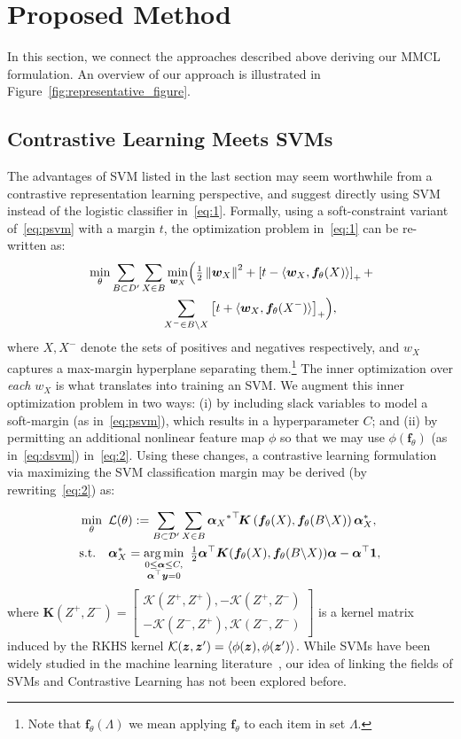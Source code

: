 \documentclass[letterpaper]{article} \usepackage{aaai22}  \usepackage{times}  \usepackage{helvet}  \usepackage{courier}  \usepackage[hyphens]{url}  \usepackage{graphicx} \urlstyle{rm} \def\UrlFont{\rm}  \usepackage{natbib}  \usepackage{caption} \DeclareCaptionStyle{ruled}{labelfont=normalfont,labelsep=colon,strut=off} \frenchspacing  \setlength{\pdfpagewidth}{8.5in}  \setlength{\pdfpageheight}{11in}
\newcommand{\vy}{\bm{y}}
\newcommand{\vw}{\bm{w}}
\newcommand{\valpha}{\bm{\alpha}}
\newcommand{\vone}{\bm{1}}
\newcommand{\dataset}{\mathcal{D}}
\newcommand{\pZ}{{Z}^{+}}
\newcommand{\nZ}{{Z}^{-}}
\newcommand{\batch}{B}
\newcommand{\kernel}{\mathcal{K}}
\newcommand{\Kernel}{\bm{K}}
\newcommand{\sX}{{X}}
\newcommand{\ft}{\bm{f}_\theta}
\newcommand{\hinge}[1]{\left[#1\right]_+}
\newcommand{\enorm}[1]{\left\|#1\right\|}
\newcommand{\ip}[2]{\langle #1, #2 \rangle}
\DeclareMathOperator*{\argmin}{arg\,min}
\begin{document}
\section{Proposed Method}
In this section, we connect the approaches described above deriving our MMCL formulation. An overview of our approach is illustrated in Figure~\ref{fig:representative_figure}.

\subsection{Contrastive Learning Meets SVMs}
The advantages of SVM listed in the last section may seem worthwhile from a contrastive representation learning perspective, and suggest directly using SVM instead of the logistic classifier in~\eqref{eq:1}. Formally, using a soft-constraint variant of~\eqref{eq:psvm} with a margin $t$, the optimization problem in~\eqref{eq:1} can be re-written as:
\begin{align}
  \label{eq:2}
  &\min\limits_\theta\sum\limits_{B \subset D'}\sum\limits_{X \in B} \min\limits_{\vw_X}\Bigl(\tfrac12\enorm{\vw_X}^2 +
  \hinge{t - \ip{\vw_X}{\ft(X)}} + \notag\\
  &\qquad\qquad\qquad\sum\limits_{X^- \in B\backslash X} \hinge{t + \ip{\vw_X}{\ft(X^-)}}\Bigr),
\end{align}
where $X, X^-$ denote the sets of positives and negatives respectively, and $w_X$ captures a max-margin hyperplane separating them.\footnote{Note that $\ft(\Lambda)$ we mean applying $\ft$ to each item in set $\Lambda$.} The inner optimization over \emph{each} $w_X$ is what translates into training an SVM. We augment this inner optimization problem in two ways: (i) by including slack variables to model a soft-margin (as in~\eqref{eq:psvm}), which results in a hyperparameter $C$; and (ii) by permitting an additional nonlinear feature map $\phi$ so that we may use $\phi(\ft)$ (as in~\eqref{eq:dsvm}) in~\eqref{eq:2}. Using these changes, a contrastive learning formulation via maximizing the SVM classification margin may be derived (by rewriting~\eqref{eq:2}) as:

\begin{align}
    &\min_{\theta}\ {\cal L}(\theta) := \sum_{\batch\subset\dataset'}\sum_{\sX\in\batch}  \valpha_X{^*}^{\top}\!\Kernel\left(\ft(\sX), \ft(\batch\backslash\sX)\right)\valpha_X^*,\label{eq:5}\\
        &\text{s.t.}\quad\label{eq:6}\valpha_X^* = \argmin\limits_{\substack{0\leq \valpha\leq C,\\\valpha^\top\vy=0}}\ \tfrac12\valpha^{\top}\Kernel(\ft(\sX), \ft(\batch\backslash\sX))\valpha-\valpha^{\top}\vone,
\end{align}
where $\Kernel(\pZ, \nZ)=\left[\begin{array}{cc}\kernel(\pZ,\pZ),  -\kernel(\pZ, \nZ)\\ -\kernel(\nZ,\pZ), \kernel(\nZ, \nZ)\end{array}\right]$
is a kernel matrix induced by the RKHS kernel $\kernel(\vz,\vz')=\ip{\phi(\vz)}{\phi(\vz')}$. While SVMs have been widely studied in the machine learning literature~\cite{smola1998learning,cortes1995support}, our idea of linking the fields of SVMs and Contrastive Learning has not been explored before.
\end{document}

